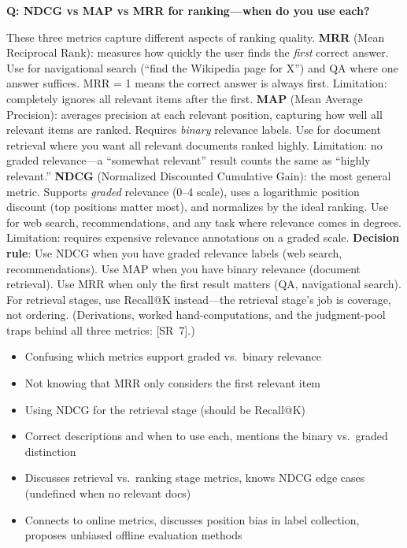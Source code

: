 \begin{interviewq}
\textbf{Q: NDCG vs MAP vs MRR for ranking---when do you use each?}

 \quad {} \quad \badgefreq{\freqhigh}

\stronganswer These three metrics capture different aspects of ranking quality. \textbf{MRR} (Mean Reciprocal Rank): measures how quickly the user finds the \textit{first} correct answer. Use for navigational search (``find the Wikipedia page for X'') and QA where one answer suffices. MRR = 1 means the correct answer is always first. Limitation: completely ignores all relevant items after the first. \textbf{MAP} (Mean Average Precision): averages precision at each relevant position, capturing how well all relevant items are ranked. Requires \textit{binary} relevance labels. Use for document retrieval where you want all relevant documents ranked highly. Limitation: no graded relevance---a ``somewhat relevant'' result counts the same as ``highly relevant.'' \textbf{NDCG} (Normalized Discounted Cumulative Gain): the most general metric. Supports \textit{graded} relevance (0--4 scale), uses a logarithmic position discount (top positions matter most), and normalizes by the ideal ranking. Use for web search, recommendations, and any task where relevance comes in degrees. Limitation: requires expensive relevance annotations on a graded scale. \textbf{Decision rule}: Use NDCG when you have graded relevance labels (web search, recommendations). Use MAP when you have binary relevance (document retrieval). Use MRR when only the first result matters (QA, navigational search). For retrieval stages, use Recall@K instead---the retrieval stage's job is coverage, not ordering. (Derivations, worked hand-computations, and the judgment-pool traps behind all three metrics: [SR~7].)

\redflags
\begin{itemize}
    \item Confusing which metrics support graded vs.\ binary relevance
    \item Not knowing that MRR only considers the first relevant item
    \item Using NDCG for the retrieval stage (should be Recall@K)
\end{itemize}


\goodgreat
\begin{itemize}
    \item {} Correct descriptions and when to use each, mentions the binary vs.\ graded distinction
    \item {} Discusses retrieval vs.\ ranking stage metrics, knows NDCG edge cases (undefined when no relevant docs)
    \item {} Connects to online metrics, discusses position bias in label collection, proposes unbiased offline evaluation methods
\end{itemize}


\end{interviewq}
